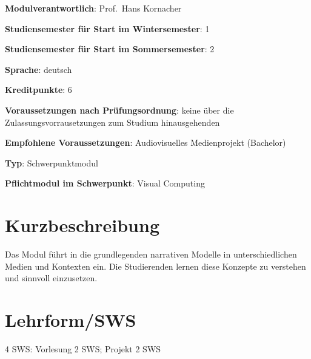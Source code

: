 \begin{modulHead}
\textbf{Modulverantwortlich}: Prof.~Hans
Kornacher
\end{modulHead}
\begin{modulHead}
\textbf{Studiensemester für
Start im Wintersemester}:
1
\end{modulHead}
\begin{modulHead}
\textbf{Studiensemester für Start
im Sommersemester}:
2
\end{modulHead}
\begin{modulHead}
\textbf{Sprache}:
deutsch
\end{modulHead}
\begin{modulHead}
\textbf{Kreditpunkte}:
6
\end{modulHead}
\begin{modulHead}
\textbf{Voraussetzungen nach
Prüfungsordnung}: keine über die Zulassungsvorrausetzungen zum Studium
hinausgehenden
\end{modulHead}
\begin{modulHead}
\textbf{Empfohlene
Voraussetzungen}: Audiovisuelles Medienprojekt
(Bachelor)
\end{modulHead}
\begin{modulHead}
\textbf{Typ}:
Schwerpunktmodul
\end{modulHead}
\begin{modulHead}
\textbf{Pflichtmodul
im Schwerpunkt}: Visual Computing
\end{modulHead}


\section*{Kurzbeschreibung\label{/mi-2017/modulbeschreibungen-master/MA_VC_Modul_Storytelling}}\label{kurzbeschreibungpathlabelmi-2017modulbeschreibungen-mastermaux5fvcux5fmodulux5fstorytelling}

Das Modul führt in die grundlegenden narrativen Modelle in
unterschiedlichen Medien und Kontexten ein. Die Studierenden lernen
diese Konzepte zu verstehen und sinnvoll einzusetzen.

\section*{Lehrform/SWS\label{/mi-2017/modulbeschreibungen-master/MA_VC_Modul_Storytelling}}\label{lehrformswspathlabelmi-2017modulbeschreibungen-mastermaux5fvcux5fmodulux5fstorytelling}

4 SWS: Vorlesung 2 SWS; Projekt 2 SWS

